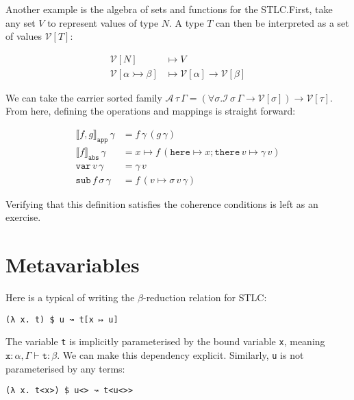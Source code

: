 \documentclass[11pt,a4paper]{article}
\newcommand*\ctxcons[2]{{#1}, {#2}}
\begin{document}
Another example is the algebra of sets and functions for the STLC.\@ First, take
any set \(V\) to represent values of type \(N\). A type \(T\) can then be
interpreted as a set of values \(\mathcal{V}[T]\):

\begin{align*}
{\mathcal{V}[N]} &\mapsto V \\
{\mathcal{V}[\alpha \rightarrowtail \beta]} &\mapsto {{\mathcal{V}[\alpha]} \to {\mathcal{V}[\beta]}}
\end{align*}

We can take the carrier sorted family \({\mathcal{A}\,\tau\,\Gamma} = {(\forall \sigma. {{\mathcal{I}\,\sigma\,\Gamma} \to
{\mathcal{V}[\sigma]}}) \to {\mathcal{V}[\tau]}}\). From here, defining the operations and mappings
is straight forward:

\begin{align*}
{{\llbracket {f , g} \rrbracket}_{\mathtt{app}}\,\gamma} &= {f\,\gamma\,(g\,\gamma)} \\
{{\llbracket {f} \rrbracket}_{\mathtt{abs}}\,\gamma} &=
  {x \mapsto {f\,({\mathtt{here} \mapsto x}; {{\mathtt{there}\,v} \mapsto \gamma\,v})}} \\
{\mathtt{var}\,v\,\gamma} &= \gamma\,v \\
{\mathtt{sub}\,f\,\sigma\,\gamma} &= {f\,(v \mapsto {\sigma\,v\,\gamma})}
\end{align*}

Verifying that this definition satisfies the coherence conditions is left as an
exercise\footnotemark{}.


\section{Metavariables}

Here is a typical of writing the \(\beta\)-reduction relation for STLC:\@

\begin{verbatim}
(λ x. t) $ u ↝ t[x ↦ u]
\end{verbatim}

The variable \verb|t| is implicitly parameterised by the bound variable
\verb|x|, meaning \({\ctxcons{\mathtt{x} : \alpha}{\Gamma}} \vdash \mathtt{t} : \beta\). We can
make this dependency explicit. Similarly, \verb|u| is not parameterised by any
terms:

\begin{verbatim}
(λ x. t<x>) $ u<> ↝ t<u<>>
\end{verbatim}
\end{document}
